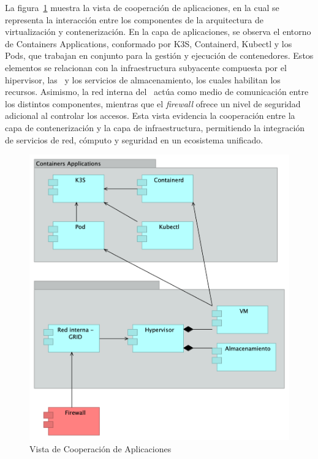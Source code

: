 \noindent
La figura~\ref{fig:vista-cooperacion-aplicacion} muestra la vista de cooperación de aplicaciones, en la cual se representa la interacción entre los componentes de la arquitectura de virtualización y contenerización. En la capa de aplicaciones, se observa el entorno de Containers Applications, conformado por K3S, Containerd, Kubectl y los Pods, que trabajan en conjunto para la gestión y ejecución de contenedores. Estos elementos se relacionan con la infraestructura subyacente compuesta por el hipervisor, las \VM\ y los servicios de almacenamiento, los cuales habilitan los recursos. Asimismo, la red interna del \GRID\ actúa como medio de comunicación entre los distintos componentes, mientras que el \textit{firewall} ofrece un nivel de seguridad adicional al controlar los accesos. Esta vista evidencia la cooperación entre la capa de contenerización y la capa de infraestructura, permitiendo la integración de servicios de red, cómputo y seguridad en un ecosistema unificado.
\begin{figure}[H]
    \centering
    \includegraphics[scale=0.2]{tablas-images/cp6/Application-Cooperation-View.png}
    \caption{Vista de Cooperación de Aplicaciones}\label{fig:vista-cooperacion-aplicacion}
\end{figure}
